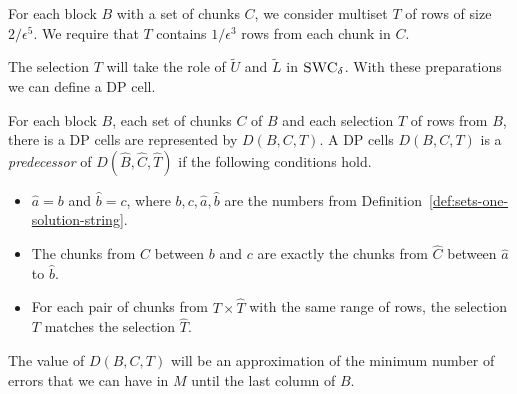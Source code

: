 \begin{definition}[Selection]
    \label{def:selection}
    For each block $B$ with a set of chunks $C$, we consider multiset $T$ of rows of size $2/\epsilon^5$.
    We require that $T$ contains $1/\epsilon^3$ rows from each chunk in $C$.
\end{definition}
The selection $T$ will take the role of $\tilde{U}$ and $\tilde{L}$ in $\textsc{SWC}_\delta$.
With these preparations we can define a DP cell.
\begin{definition}[DP cell]
    For each block $B$, each set of chunks $C$ of $B$ and each selection $T$ of rows from $B$, there is a DP cells are represented by $D(B,C,T)$. 
    A DP cells $D(B,C,T)$ is a \emph{predecessor} of $D(\hat B,\hat C,\hat T)$ if the following conditions hold.
    \begin{itemize}
        \item $\hat{a} = b$ and $\hat{b} = c$, where $b,c,\hat{a},\hat{b}$ are the numbers from Definition~\ref{def:sets-one-solution-string}.
        \item The chunks from $C$ between $b$ and $c$ are exactly the chunks from $\hat{C}$ between $\hat{a}$ to $\hat{b}$.
        \item For each pair of chunks from $T \times \hat{T}$ with the same range of rows, the selection $T$ matches the selection $\hat{T}$. 
            \label{def:dp-cell-one-solution-string}
    \end{itemize}
\end{definition} 

The value of $D(B,C,T)$ will be an approximation of the minimum number of errors
that we can have in $M$ until the last column of $B$.

